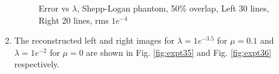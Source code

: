 \begin{enumerate}
\begin{figure}[H]

\hspace{-0.1in}
\caption [Error vs $\lambda$, Shepp-Logan phantom, 50\% overlap,  Left 30 lines, Right 20 lines, rms $1e^{-4}$]{Error vs $\lambda$, Shepp-Logan phantom, 50\% overlap,  Left 30 lines, Right 20 lines, rms $1e^{-4}$}
\label{fig:expt34}
\end{figure}

\item The reconstructed left and right images for $\lambda = 1e^{-3.5}$ for  $\mu  = 0.1 $  and $\lambda = 1e^{-2}$ for  $\mu = 0$ are shown in Fig. \ref{fig:expt35} and  Fig. \ref{fig:expt36} respectively. 


\end{enumerate}
